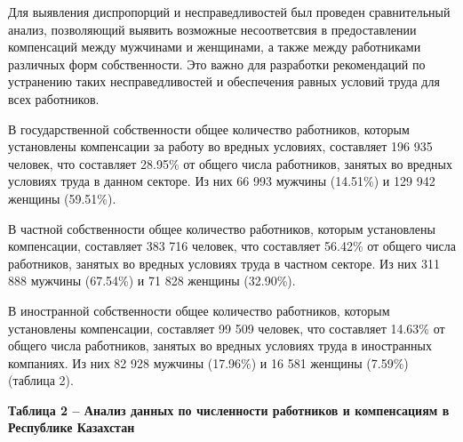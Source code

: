 Для выявления диспропорций и несправедливостей был проведен
сравнительный анализ, позволяющий выявить возможные несоответсвия в
предоставлении компенсаций между мужчинами и женщинами, а также между
работниками различных форм собственности. Это важно для разработки
рекомендаций по устранению таких несправедливостей и обеспечения равных
условий труда для всех работников.

В государственной собственности общее количество работников, которым
установлены компенсации за работу во вредных условиях, составляет 196
935 человек, что составляет 28.95\% от общего числа работников, занятых
во вредных условиях труда в данном секторе. Из них 66 993 мужчины
(14.51\%) и 129 942 женщины (59.51\%).

В частной собственности общее количество работников, которым установлены
компенсации, составляет 383 716 человек, что составляет 56.42\% от
общего числа работников, занятых во вредных условиях труда в частном
секторе. Из них 311 888 мужчины (67.54\%) и 71 828 женщины (32.90\%).

В иностранной собственности общее количество работников, которым
установлены компенсации, составляет 99 509 человек, что составляет
14.63\% от общего числа работников, занятых во вредных условиях труда в
иностранных компаниях. Из них 82 928 мужчины (17.96\%) и 16 581 женщины
(7.59\%) (таблица 2).

{\bfseries Таблица 2 -- Анализ данных по численности работников и
компенсациям в Республике Казахстан}


